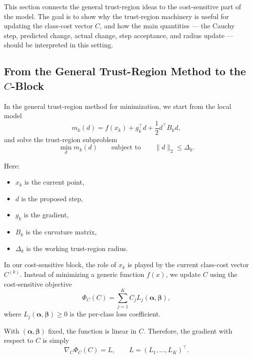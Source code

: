 \documentclass{article}
\begin{document}
This section connects the general trust-region ideas to the cost-sensitive part of the model. The goal is to show why the trust-region machinery is useful for updating the class-cost vector $C$, and how the main quantities --- the Cauchy step, predicted change, actual change, step acceptance, and radius update --- should be interpreted in this setting.

\subsection{From the General Trust-Region Method to the $C$-Block}

In the general trust-region method for minimization, we start from the local model
\begin{equation}
 m_k(d) = f(x_k) + g_k^\top d + \frac{1}{2} d^\top B_k d,
\end{equation}
and solve the trust-region subproblem
\begin{equation}
 \min_d m_k(d)
 \qquad \text{subject to} \qquad \|d\|_2 \leq \Delta_k.
\end{equation}

Here:
\begin{itemize}
    \item $x_k$ is the current point,
    \item $d$ is the proposed step,
    \item $g_k$ is the gradient,
    \item $B_k$ is the curvature matrix,
    \item $\Delta_k$ is the working trust-region radius.
\end{itemize}

In our cost-sensitive block, the role of $x_k$ is played by the current class-cost vector $C^{(k)}$. Instead of minimizing a generic function $f(x)$, we update $C$ using the cost-sensitive objective
\begin{equation}
 \Phi_C(C) = \sum_{j=1}^{K} C_j L_j(\boldsymbol{\alpha},\boldsymbol{\beta}),
\end{equation}
where $L_j(\boldsymbol{\alpha},\boldsymbol{\beta}) \geq 0$ is the per-class loss coefficient.

With $(\boldsymbol{\alpha},\boldsymbol{\beta})$ fixed, the function is linear in $C$. Therefore, the gradient with respect to $C$ is simply
\begin{equation}
 \nabla_C \Phi_C(C) = L,
 \qquad
 L = (L_1,\ldots,L_K)^\top.
\end{equation}
\end{document}
